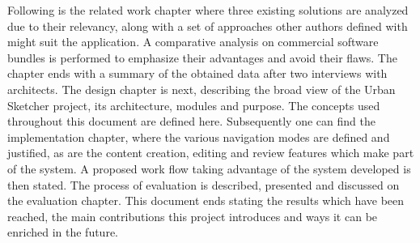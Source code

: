 
Following is the related work chapter where three existing solutions are analyzed due to their relevancy,
along with a set of approaches other authors defined with might suit the application.
A comparative analysis on commercial software bundles is performed to emphasize their advantages and avoid
their flaws. The chapter ends with a summary of the obtained data after two interviews with architects.
The design chapter is next, describing the broad view of the Urban Sketcher project, its architecture, modules
and purpose. The concepts used throughout this document are defined here.
Subsequently one can find the implementation chapter, where the various navigation modes are defined and
justified, as are the content creation, editing and review features which make part of the system.
A proposed work flow taking advantage of the system developed is then stated.
The process of evaluation is described, presented and discussed on the evaluation chapter.
This document ends stating the results which have been reached, the main contributions
this project introduces and ways it can be enriched in the future.



%
%
%
%		
%	


